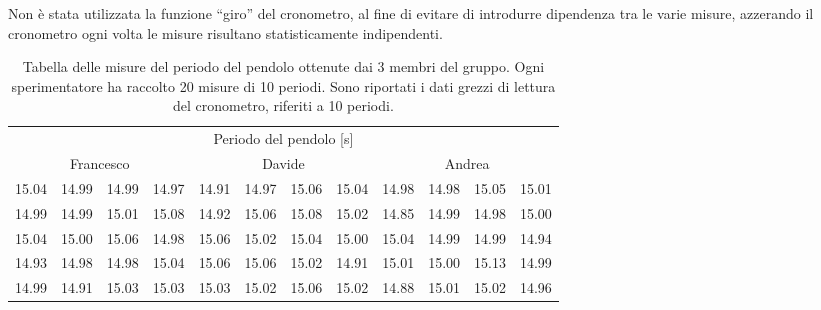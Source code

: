 Non è stata utilizzata la funzione ``giro'' del cronometro, al fine di evitare
di introdurre dipendenza tra le varie misure, azzerando il cronometro ogni 
volta le misure risultano statisticamente indipendenti.

\begin{table}[bt]
	\begin{tabular} {c c c c | c c c c | c c c c}
		\toprule
		\multicolumn{12}{c}{Periodo del pendolo [s]} \\
		\multicolumn{4}{c}{Francesco} & \multicolumn{4}{c}{Davide} & \multicolumn{4}{c}{Andrea} \\
		\midrule
		15.04 & 14.99 & 14.99 & 14.97 & 14.91 & 14.97 & 15.06 & 15.04 & 14.98 & 14.98 & 15.05 & 15.01 \\
		14.99 & 14.99 & 15.01 & 15.08 & 14.92 & 15.06 & 15.08 & 15.02 & 14.85 & 14.99 & 14.98 & 15.00 \\
		15.04 & 15.00 & 15.06 & 14.98 & 15.06 & 15.02 & 15.04 & 15.00 & 15.04 & 14.99 & 14.99 & 14.94 \\
		14.93 & 14.98 & 14.98 & 15.04 & 15.06 & 15.06 & 15.02 & 14.91 & 15.01 & 15.00 & 15.13 & 14.99 \\
		14.99 & 14.91 & 15.03 & 15.03 & 15.03 & 15.02 & 15.06 & 15.02 & 14.88 & 15.01 & 15.02 & 14.96 \\
		\bottomrule
	\end{tabular}

	\caption{Tabella delle misure del periodo del pendolo ottenute dai 3 membri del gruppo.
        Ogni sperimentatore ha raccolto 20 misure di 10 periodi. Sono riportati
        i dati grezzi di lettura del cronometro, riferiti a 10 periodi. }
    \label{tab:pendolo}
\end{table}

